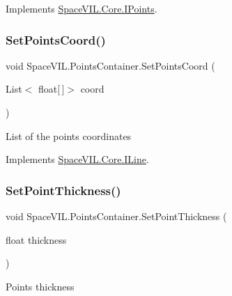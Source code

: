 Implements \mbox{\hyperlink{interface_space_v_i_l_1_1_core_1_1_i_points}{Space\+V\+I\+L.\+Core.\+I\+Points}}.

\mbox{\label{class_space_v_i_l_1_1_points_container_abcf47862e61ce7aea7992ced4258da2c}} 
\subsubsection{\texorpdfstring{Set\+Points\+Coord()}{SetPointsCoord()}}
{\footnotesize\ttfamily void Space\+V\+I\+L.\+Points\+Container.\+Set\+Points\+Coord (\begin{DoxyParamCaption}\item[{List$<$ float\mbox{[}$\,$\mbox{]}$>$}]{coord }\end{DoxyParamCaption})}



List of the points coordinates 



Implements \mbox{\hyperlink{interface_space_v_i_l_1_1_core_1_1_i_line}{Space\+V\+I\+L.\+Core.\+I\+Line}}.

\mbox{\label{class_space_v_i_l_1_1_points_container_a0926aa9cf438fe742d4b7ad6c5cdcd7d}} 
\subsubsection{\texorpdfstring{Set\+Point\+Thickness()}{SetPointThickness()}}
{\footnotesize\ttfamily void Space\+V\+I\+L.\+Points\+Container.\+Set\+Point\+Thickness (\begin{DoxyParamCaption}\item[{float}]{thickness }\end{DoxyParamCaption})}



Points thickness 



